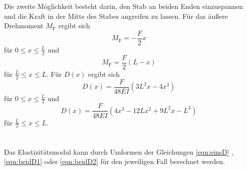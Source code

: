     Die zweite Möglichkeit besteht darin, den Stab an beiden Enden einzuspannen und die Kraft in der 
    Mitte des Stabes angreifen zu lassen.
    Für das äußere Drehmoment $M_\text{F}$ ergibt sich 
    \begin{equation}
        M_\text{F} = - \frac{F}{2} x 
    \end{equation}
    für $0 \leq x \leq \frac{L}{2}$ und
    \begin{equation}
        M_\text{F} = \frac{F}{2} (L-x)
    \end{equation}
    für $\frac{L}{2} \leq x \leq L$.
    Für $D(x)$ ergibt sich 
    \begin{equation}
        D(x) = \frac{F}{48EI} (3L^2 x - 4x^3) \label{eqn:beidD1}
    \end{equation}
    für $0 \leq x \leq \frac{L}{2}$ und 
    \begin{equation}
        D(x) = \frac{F}{48EI} (4x^3 - 12Lx^2 + 9L^2 x - L^3) \label{eqn:beidD2}
    \end{equation}
    für $\frac{L}{2} \leq x \leq L$. \\ \\ \\

Das Elastizitätsmodul kann durch Umformen der Gleichungen \eqref{eqn:einsD} , \eqref{eqn:beidD1} oder \eqref{eqn:beidD2}
für den jeweiligen Fall berechnet werden.
